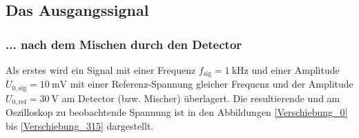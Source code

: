 \subsection{Das Ausgangssignal}
\subsubsection{... nach dem Mischen durch den Detector}
Als erstes wird ein Signal mit einer Frequenz $f_\text{sig} = \SI{1}{\kilo\hertz}$ und einer Amplitude $U_{0,\text{sig}} = \SI{10}{\milli\volt}$ mit einer Referenz-Spannung gleicher Frequenz und der Amplitude $U_{0,\text{ref}} = \SI{30}{\volt}$ am Detector (bzw. Mischer) überlagert. Die resultierende und am Oszilloskop zu beobachtende Spannung ist in den Abbildungen \ref{Verschiebung_0} bis \ref{Verschiebung_315} dargestellt. \\

\clearpage

